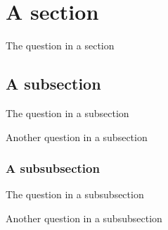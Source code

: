 \documentclass{article}
\newcounter{question}
\begin{document}

    \section{A section}

    \begin{question}\label{qu:first}
        The question in a section
    \end{question}

    \subsection{A subsection}

    \begin{question}
        The question in a subsection
    \end{question}

    \begin{question}[number = 7, label = lower-roman]\label{qu:lowerroman}
        Another question in a subsection
    \end{question}

    \subsubsection{A subsubsection}

    \begin{question}\label{qu:test}
        The question in a subsubsection
    \end{question}

    \begin{question}
        Another question in a subsubsection
    \end{question}
\end{document}
